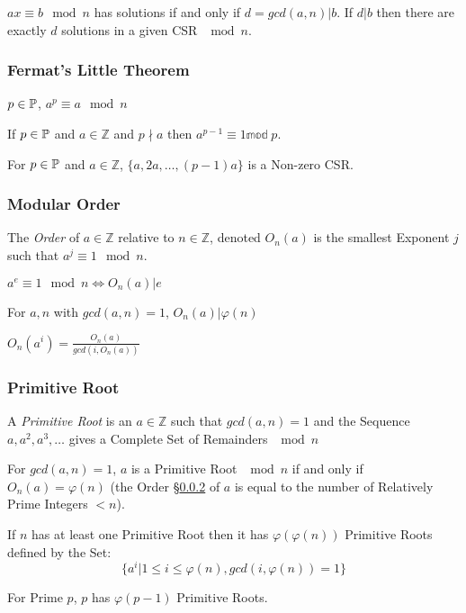 $ax \equiv b \mod n$ has solutions if and only if $d = gcd(a,n) | b$.
If $d|b$ then there are exactly $d$ solutions in a given CSR $\mod n$.



\subsubsection{Fermat's Little Theorem}\label{sec:fermat_little}

$p \in \mathbb{P}$, $a^p \equiv a \mod n$

If $p \in \mathbb{P}$ and $a \in \mathbb{Z}$ and $p \nmid a$ then
$a^{p-1} \equiv 1 \mathbb{mod}\;p$.

For $p \in \mathbb{P}$ and $a \in \mathbb{Z}$, $\{ a, 2a, \ldots, (p-1)a
\}$ is a Non-zero CSR.



\subsubsection{Modular Order}\label{sec:modular_order}

The \emph{Order} of $a \in \mathbb{Z}$ relative to $n \in \mathbb{Z}$,
denoted $O_n(a)$ is the smallest Exponent $j$ such that $a^j \equiv 1
\mod n$.

$a^e \equiv 1 \mod n \Leftrightarrow O_n(a) | e$

For $a, n$ with $gcd(a,n) = 1$, $O_n(a) | \varphi(n)$

$O_n(a^i) = \frac{O_n(a)}{gcd(i,O_n(a))}$



\subsubsection{Primitive Root}\label{sec:primitive_root}

A \emph{Primitive Root} is an $a \in \mathbb{Z}$ such that $gcd(a,n) =
1$ and the Sequence $a, a^2, a^3, \ldots$ gives a Complete Set of
Remainders $\mod n$

For $gcd(a,n) = 1$, $a$ is a Primitive Root $\mod n$ if and only if
$O_n(a) = \varphi(n)$ (the Order \S\ref{sec:modular_order} of $a$ is
equal to the number of Relatively Prime Integers $< n$).

If $n$ has at least one Primitive Root then it has
$\varphi(\varphi(n))$ Primitive Roots defined by the Set:
\[
  \{ a^i | 1 \leq i \leq \varphi(n), gcd(i,\varphi(n)) = 1 \}
\]

For Prime $p$, $p$ has $\varphi(p-1)$ Primitive Roots.

